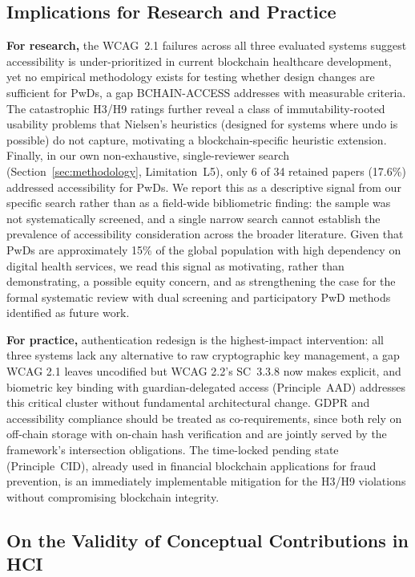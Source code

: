 \documentclass[journal,onecolumn]{IEEEtran}
\begin{document}
\subsection{Implications for Research and Practice}

\textbf{For research,} the WCAG~2.1 failures across all three evaluated systems suggest accessibility is under-prioritized in current blockchain healthcare development, yet no empirical methodology exists for testing whether design changes are sufficient for PwDs, a gap BCHAIN-ACCESS addresses with measurable criteria. The catastrophic H3/H9 ratings further reveal a class of immutability-rooted usability problems that Nielsen's heuristics (designed for systems where undo is possible) do not capture, motivating a blockchain-specific heuristic extension. Finally, in our own non-exhaustive, single-reviewer search (Section~\ref{sec:methodology}, Limitation~L5), only 6 of 34 retained papers (17.6\%) addressed accessibility for PwDs. We report this as a descriptive signal from our specific search rather than as a field-wide bibliometric finding: the sample was not systematically screened, and a single narrow search cannot establish the prevalence of accessibility consideration across the broader literature. Given that PwDs are approximately 15\% of the global population \cite{who2023disability} with high dependency on digital health services, we read this signal as motivating, rather than demonstrating, a possible equity concern, and as strengthening the case for the formal systematic review with dual screening and participatory PwD methods identified as future work.

\textbf{For practice,} authentication redesign is the highest-impact intervention: all three systems lack any alternative to raw cryptographic key management, a gap WCAG 2.1 leaves uncodified but WCAG 2.2's SC~3.3.8 now makes explicit, and biometric key binding with guardian-delegated access (Principle~AAD) addresses this critical cluster without fundamental architectural change. GDPR and accessibility compliance should be treated as co-requirements, since both rely on off-chain storage with on-chain hash verification and are jointly served by the framework's intersection obligations. The time-locked pending state (Principle~CID), already used in financial blockchain applications for fraud prevention, is an immediately implementable mitigation for the H3/H9 violations without compromising blockchain integrity.

\subsection{On the Validity of Conceptual Contributions in HCI}
\end{document}
